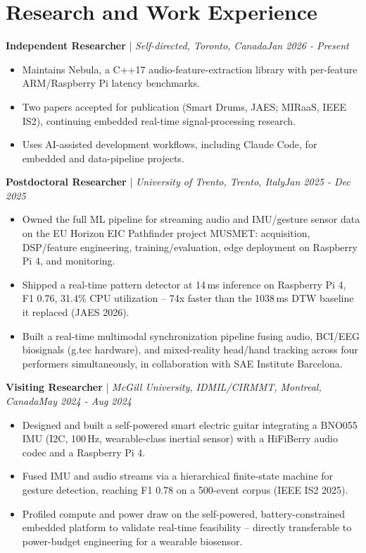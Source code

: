 \documentclass[11pt]{article}
\newenvironment{cvrole}[5]{%
  \par\noindent\textbf{\large #1} | \textit{\small #2, #3}\hfill \textit{\small #4 - #5}\par
  \begin{itemize}[leftmargin=2em, itemsep=-0.3em, topsep=-0.5em]%
}{%
  \end{itemize}\par\noindent\mbox{}\par\vspace{0.1em}%
}
\begin{document}
\section*{Research and Work Experience}
\begin{cvrole}{Independent Researcher}{Self-directed}{Toronto, Canada}{Jan 2026}{Present}
  \item Maintains Nebula, a C++17 audio-feature-extraction library with per-feature ARM/Raspberry Pi latency benchmarks.
  \item Two papers accepted for publication (Smart Drums, JAES; MIRaaS, IEEE IS2), continuing embedded real-time signal-processing research.
  \item Uses AI-assisted development workflows, including Claude Code, for embedded and data-pipeline projects.
\end{cvrole}
\begin{cvrole}{Postdoctoral Researcher}{University of Trento}{Trento, Italy}{Jan 2025}{Dec 2025}
  \item Owned the full ML pipeline for streaming audio and IMU/gesture sensor data on the EU Horizon EIC Pathfinder project MUSMET: acquisition, DSP/feature engineering, training/evaluation, edge deployment on Raspberry Pi 4, and monitoring.
  \item Shipped a real-time pattern detector at 14\,ms inference on Raspberry Pi 4, F1 0.76, 31.4\% CPU utilization -- 74x faster than the 1038\,ms DTW baseline it replaced (JAES 2026).
  \item Built a real-time multimodal synchronization pipeline fusing audio, BCI/EEG biosignals (g.tec hardware), and mixed-reality head/hand tracking across four performers simultaneously, in collaboration with SAE Institute Barcelona.
\end{cvrole}
\begin{cvrole}{Visiting Researcher}{McGill University, IDMIL/CIRMMT}{Montreal, Canada}{May 2024}{Aug 2024}
  \item Designed and built a self-powered smart electric guitar integrating a BNO055 IMU (I2C, 100\,Hz, wearable-class inertial sensor) with a HiFiBerry audio codec and a Raspberry Pi 4.
  \item Fused IMU and audio streams via a hierarchical finite-state machine for gesture detection, reaching F1 0.78 on a 500-event corpus (IEEE IS2 2025).
  \item Profiled compute and power draw on the self-powered, battery-constrained embedded platform to validate real-time feasibility -- directly transferable to power-budget engineering for a wearable biosensor.
\end{cvrole}
\end{document}
